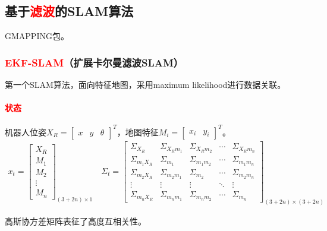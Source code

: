\documentclass[
12pt, %
a4paper, 
oneside, %
]{scrartcl}
\begin{document}
\subsection[基于滤波的SLAM算法]{基于\textcolor{red}{滤波}的SLAM算法}
GMAPPING包。
\subsubsection[EKF-SLAM]{\textcolor{red}{EKF-SLAM}（扩展卡尔曼滤波SLAM）}
第一个SLAM算法，面向特征地图，采用maximum likelihood进行数据关联。
\paragraph{\textcolor{red}{状态}}
机器人位姿$ X_R = \begin{bmatrix} x & y & \theta \end{bmatrix}^T $，地图特征$ M_i = \begin{bmatrix} x_i & y_i \end{bmatrix}^T $。
\begin{align*}
x_t = \begin{bmatrix} X_R \\ M_1 \\ M_2 \\ \vdots \\ M_n \end{bmatrix}_{(3 + 2n) \times 1} \quad 
\Sigma_t = \begin{bmatrix} 
\Sigma_{X_R} & \Sigma_{X_R m_1} & \Sigma_{X_R m_2} & \cdots & \Sigma_{X_R m_n} \\
\Sigma_{m_1 X_R} & \Sigma_{m_1} & \Sigma_{m_1 m_2} & \cdots & \Sigma_{m_1 m_n} \\
\Sigma_{m_2 X_R} & \Sigma_{m_2 m_1} & \Sigma_{m_2} & \cdots & \Sigma_{m_2 m_n} \\
\vdots & \vdots & \vdots & \ddots & \vdots \\
\Sigma_{m_n X_R} & \Sigma_{m_n m_1} & \Sigma_{m_n m_2} & \cdots & \Sigma_{m_n}
\end{bmatrix}_{(3 + 2n) \times (3 + 2n)}
\end{align*}

高斯协方差矩阵表征了高度互相关性。
\end{document}
